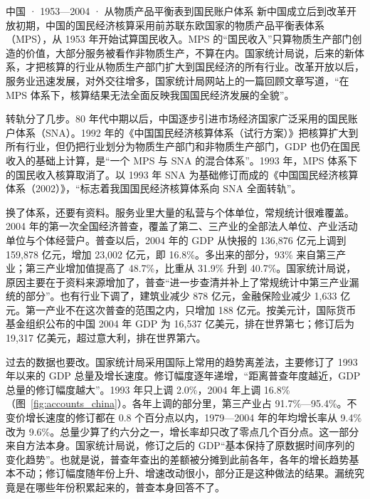 \begin{case}{中国 · 1953—2004 · 从物质产品平衡表到国民账户体系}
新中国成立后到改革开放初期，中国的国民经济核算采用前苏联东欧国家的物质产品平衡表体系（MPS），从 1953 年开始试算国民收入。MPS 的“国民收入”只算物质生产部门创造的价值，大部分服务被看作非物质生产，不算在内。国家统计局说，后来的新体系，才把核算的行业从物质生产部门扩大到国民经济的所有行业\cite{nbs2010}。改革开放以后，服务业迅速发展，对外交往增多，国家统计局网站上的一篇回顾文章写道，“在 MPS 体系下，核算结果无法全面反映我国国民经济发展的全貌”\cite{nbs2010}。

转轨分了几步。80 年代中期以后，中国逐步引进市场经济国家广泛采用的国民账户体系（SNA）。1992 年的《中国国民经济核算体系（试行方案）》把核算扩大到所有行业，但仍把行业划分为物质生产部门和非物质生产部门，GDP 也仍在国民收入的基础上计算，是“一个 MPS 与 SNA 的混合体系”。1993 年，MPS 体系下的国民收入核算取消了。以 1993 年 SNA 为基础修订而成的《中国国民经济核算体系（2002）》，“标志着我国国民经济核算体系向 SNA 全面转轨”\cite{nbs2010}。

换了体系，还要有资料。服务业里大量的私营与个体单位，常规统计很难覆盖。2004 年的第一次全国经济普查，覆盖了第二、三产业的全部法人单位、产业活动单位与个体经营户。普查以后，2004 年的 GDP 从快报的 136,876 亿元上调到 159,878 亿元，增加 23,002 亿元，即 16.8\%。多出来的部分，93\% 来自第三产业；第三产业增加值提高了 48.7\%，比重从 31.9\% 升到 40.7\%。国家统计局说，原因主要在于资料来源增加了，普查“进一步查清并补上了常规统计中第三产业漏统的部分”\cite{nbs2006b}。也有行业下调了，建筑业减少 878 亿元，金融保险业减少 1,633 亿元。第一产业不在这次普查的范围之内，只增加 188 亿元\cite{nbs2006b}。按美元计，国际货币基金组织公布的中国 2004 年 GDP 为 16,537 亿美元，排在世界第七；修订后为 19,317 亿美元，超过意大利，排在世界第六\cite{nbs2006a}。

过去的数据也要改。国家统计局采用国际上常用的趋势离差法，主要修订了 1993 年以来的 GDP 总量及增长速度。修订幅度逐年递增，“距离普查年度越近，GDP 总量的修订幅度越大”。1993 年只上调 2.0\%，2004 年上调 16.8\%（图~\ref{fig:accounts_china}）。各年上调的部分里，第三产业占 91.7\%—95.4\%。不变价增长速度的修订都在 0.8 个百分点以内，1979—2004 年的年均增长率从 9.4\% 改为 9.6\%\cite{nbs2006a}。总量少算了约六分之一，增长率却只改了零点几个百分点。这一部分来自方法本身。国家统计局说，修订之后的 GDP“基本保持了原数据时间序列的变化趋势”\cite{nbs2006a}。也就是说，普查年查出的差额被分摊到此前各年，各年的增长趋势基本不动；修订幅度随年份上升、增速改动很小，部分正是这种做法的结果。漏统究竟是在哪些年份积累起来的，普查本身回答不了。
\end{case}

